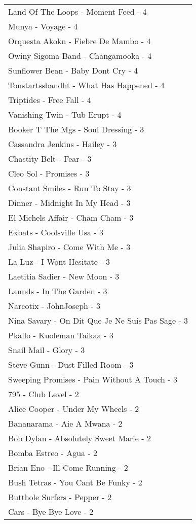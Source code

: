 \documentclass[
]{article}
\begin{document}
\begin{longtable}{l}
Land Of The Loops - Moment Feed - 4 \\ 
Munya - Voyage - 4 \\ 
Orquesta Akokn - Fiebre De Mambo - 4 \\ 
Owiny Sigoma Band - Changamooka - 4 \\ 
Sunflower Bean - Baby Dont Cry - 4 \\ 
Tonstartssbandht - What Has Happened - 4 \\ 
Triptides - Free Fall - 4 \\ 
Vanishing Twin - Tub Erupt - 4 \\ 
Booker T The Mgs - Soul Dressing - 3 \\ 
Cassandra Jenkins - Hailey - 3 \\ 
Chastity Belt - Fear - 3 \\ 
Cleo Sol - Promises - 3 \\ 
Constant Smiles - Run To Stay - 3 \\ 
Dinner - Midnight In My Head - 3 \\ 
El Michels Affair - Cham Cham - 3 \\ 
Exbats - Coolsville Usa - 3 \\ 
Julia Shapiro - Come With Me - 3 \\ 
La Luz - I Wont Hesitate - 3 \\ 
Laetitia Sadier - New Moon - 3 \\ 
Lannds - In The Garden - 3 \\ 
Narcotix - JohnJoseph - 3 \\ 
Nina Savary - On Dit Que Je Ne Suis Pas Sage - 3 \\ 
Pkallo - Kuoleman Taikaa - 3 \\ 
Snail Mail - Glory - 3 \\ 
Steve Gunn - Dust Filled Room - 3 \\ 
Sweeping Promises - Pain Without A Touch - 3 \\ 
795 - Club Level - 2 \\ 
Alice Cooper - Under My Wheels - 2 \\ 
Bananarama - Aie A Mwana - 2 \\ 
Bob Dylan - Absolutely Sweet Marie - 2 \\ 
Bomba Estreo - Agua - 2 \\ 
Brian Eno - Ill Come Running - 2 \\ 
Bush Tetras - You Cant Be Funky - 2 \\ 
Butthole Surfers - Pepper - 2 \\ 
Cars - Bye Bye Love - 2 \\ 

\end{longtable}
\end{document}
